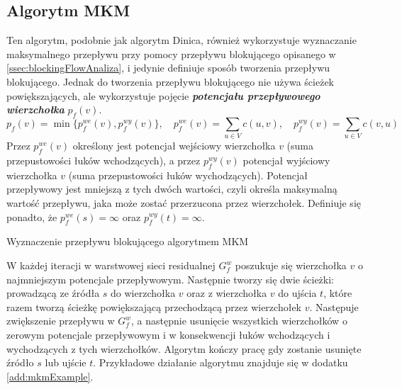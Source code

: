 \subsection{Algorytm MKM}\label{ssec:mkmAnaliza}
Ten algorytm, podobnie jak algorytm Dinica, również wykorzystuje wyznaczanie maksymalnego przepływu przy pomocy przepływu blokującego opisanego w \ref{ssec:blockingFlowAnaliza}, i jedynie definiuje sposób tworzenia przepływu blokującego. Jednak do tworzenia przepływu blokującego nie używa ścieżek powiększających, ale wykorzystuje pojęcie \textit{\textbf{potencjału przepływowego wierzchołka}} $ p_f(v) $.
$$ p_f(v)=\min\{p_f^{we}(v),p_f^{wy}(v)\},\quad p_f^{we}(v)=\sum_{u\in V}{c(u,v)},\quad p_f^{wy}(v)=\sum_{u\in V}{c(v,u)} $$
Przez $ p_f^{we}(v) $ określony jest potencjał wejściowy wierzchołka $ v $ (suma przepustowości łuków wchodzących), a przez $ p_f^{wy}(v) $ potencjał wyjściowy wierzchołka $ v $ (suma przepustowości łuków wychodzących). Potencjał przepływowy jest mniejszą z tych dwóch wartości, czyli określa maksymalną wartość przepływu, jaka może zostać przerzucona przez wierzchołek. Definiuje się ponadto, że $ p_f^{we}(s)=\infty $ oraz $ p_f^{wy}(t)=\infty $.
\begin{algorithm}[H]
	\caption{Wyznaczenie przepływu blokującego algorytmem MKM}\label{mkmPseudo}
	\begin{algorithmic}
			\Repeat
			\space{}
		\EndProcedure
	\end{algorithmic}
\end{algorithm}\vfill
W każdej iteracji w warstwowej sieci residualnej $ G_f^w $ poszukuje się wierzchołka $ v $ o najmniejszym potencjale przepływowym. Następnie tworzy się dwie ścieżki: prowadzącą ze źródła $ s $ do wierzchołka $ v $ oraz z wierzchołka $ v $ do ujścia $ t $, które razem tworzą ścieżkę powiększającą przechodzącą przez wierzchołek $ v $. Następuje zwiększenie przepływu w $ G_f^w $, a następnie usunięcie wszystkich wierzchołków o zerowym potencjale przepływowym i w konsekwencji łuków wchodzących i wychodzących z tych wierzchołków. Algorytm kończy pracę gdy zostanie usunięte źródło $ s $ lub ujście $ t $. Przykładowe działanie algorytmu znajduje się w dodatku \ref{add:mkmExample}.

